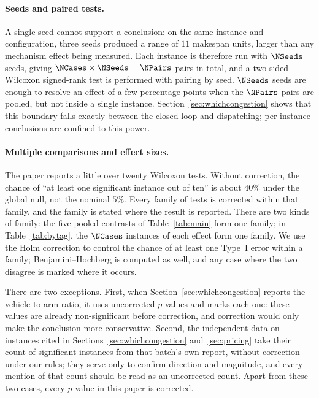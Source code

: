 \paragraph{Seeds and paired tests.}
A single seed cannot support a conclusion: on the same instance and configuration, three seeds produced a range of $11$ makespan units, larger than any mechanism effect being measured.
Each instance is therefore run with $\NSeeds$ seeds, giving $\NCases\times\NSeeds=\NPairs$ pairs in total, and a two-sided Wilcoxon signed-rank test is performed with pairing by seed.
$\NSeeds$ seeds are enough to resolve an effect of a few percentage points when the $\NPairs$ pairs are pooled, but not inside a single instance.
Section~\ref{sec:whichcongestion} shows that this boundary falls exactly between the closed loop and dispatching; per-instance conclusions are confined to this power.

\paragraph{Multiple comparisons and effect sizes.}
The paper reports a little over twenty Wilcoxon tests. Without correction, the chance of ``at least one significant instance out of ten'' is about $40\%$ under the global null, not the nominal $5\%$.
Every family of tests is corrected within that family, and the family is stated where the result is reported.
There are two kinds of family: the five pooled contrasts of Table~\ref{tab:main} form one family; in Table~\ref{tab:bytag}, the $\NCases$ instances of each effect form one family.
We use the Holm correction to control the chance of at least one Type~I error within a family; Benjamini--Hochberg is computed as well, and any case where the two disagree is marked where it occurs.

There are two exceptions. First, when Section~\ref{sec:whichcongestion} reports the vehicle-to-arm ratio, it uses uncorrected $p$-values and marks each one: these values are already non-significant before correction, and correction would only make the conclusion more conservative.
Second, the independent data on \MatrixCells{} instances cited in Sections~\ref{sec:whichcongestion} and~\ref{sec:pricing} take their count of significant instances from that batch's own report, without correction under our rules; they serve only to confirm direction and magnitude, and every mention of that count should be read as an uncorrected count.
Apart from these two cases, every $p$-value in this paper is corrected.

